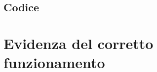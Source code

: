 \documentclass[a4paper]{article}
\begin{document}
\subsection{Codice}








\section{Evidenza del corretto funzionamento}
\end{document}
